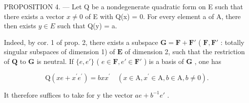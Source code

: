 PROPOSITION 4. --- Let Q be a nondegenerate quadratic form on E such that there exists a vector \(x \neq 0\) of E with Q(x) = 0. For every element a of A, there then exists \(y \in E\) such that Q(y) = a.

Indeed, by cor. 1 of prop. 2, there exists a subspace \(\mathbf{G} = \mathbf{F} + \mathbf{F}'\) ( \(\mathbf{F}, \mathbf{F}'\) : totally singular subspaces of dimension 1) of \(\mathbf{E}\) of dimension 2, such that the restriction of \(\mathbf{Q}\) to \(\mathbf{G}\) is neutral. If \(\{e, e'\}\) ( \(e \in \mathbf{F}, e' \in \mathbf{F}'\) ) is a basis of \(\mathbf{G}\) , one has

\[
\mathrm{Q} (x e + x ^ {\prime} e ^ {\prime}) = b x x ^ {\prime} \quad (x \in \mathrm{A}, x ^ {\prime} \in \mathrm{A}, b \in \mathrm{A}, b \neq 0).
\]

It therefore suffices to take for y the vector \(ae + b^{-1}e'\) .
\relax{}

